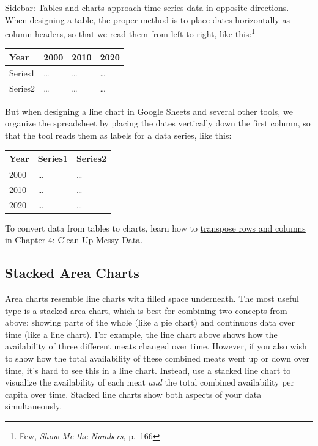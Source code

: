 \documentclass[
  english,
]{book}
\begin{document}
Sidebar: Tables and charts approach time-series data in opposite directions. When designing a table, the proper method is to place dates horizontally as column headers, so that we read them from left-to-right, like this:\footnote{Few, \emph{Show {Me} the {Numbers}}, p.~166}

\begin{longtable}[]{@{}llll@{}}
\toprule
Year & 2000 & 2010 & 2020 \\
\midrule
\endhead
Series1 & \ldots{} & \ldots{} & \ldots{} \\
Series2 & \ldots{} & \ldots{} & \ldots{} \\
\bottomrule
\end{longtable}

But when designing a line chart in Google Sheets and several other tools, we organize the spreadsheet by placing the dates vertically down the first column, so that the tool reads them as labels for a data series, like this:

\begin{longtable}[]{@{}lll@{}}
\toprule
Year & Series1 & Series2 \\
\midrule
\endhead
2000 & \ldots{} & \ldots{} \\
2010 & \ldots{} & \ldots{} \\
2020 & \ldots{} & \ldots{} \\
\bottomrule
\end{longtable}

To convert data from tables to charts, learn how to \href{transpose.html}{transpose rows and columns in Chapter 4: Clean Up Messy Data}.

\hypertarget{stacked-area-charts}{%
\subsection*{Stacked Area Charts}\label{stacked-area-charts}}

Area charts resemble line charts with filled space underneath. The most useful type is a stacked area chart, which is best for combining two concepts from above: showing parts of the whole (like a pie chart) and continuous data over time (like a line chart). For example, the line chart above shows how the availability of three different meats changed over time. However, if you also wish to show how the total availability of these combined meats went up or down over time, it's hard to see this in a line chart. Instead, use a stacked line chart to visualize the availability of each meat \emph{and} the total combined availability per capita over time. Stacked line charts show both aspects of your data simultaneously.
\end{document}
